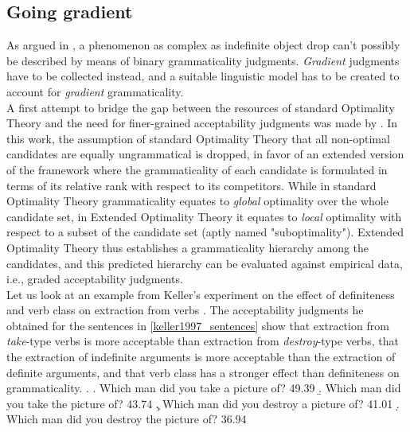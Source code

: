 \subsection{Going gradient}  %
As argued in , a phenomenon as complex as indefinite object drop can't possibly be described by means of binary grammaticality judgments. \textit{Gradient} judgments have to be collected instead, and a suitable linguistic model has to be created to account for \textit{gradient} grammaticality.\\
A first attempt to bridge the gap between the resources of standard Optimality Theory and the need for finer-grained acceptability judgments was made by \textcite{keller1997extraction}. In this work, the assumption of standard Optimality Theory that all non-optimal candidates are equally ungrammatical is dropped, in favor of an extended version of the framework where the grammaticality of each candidate is formulated in terms of its relative rank with respect to its competitors. While in standard Optimality Theory grammaticality equates to \textit{global} optimality over the whole candidate set, in Extended Optimality Theory it equates to \textit{local} optimality with respect to a subset of the candidate set (aptly named "suboptimality"). Extended Optimality Theory thus establishes a grammaticality hierarchy among the candidates, and this predicted hierarchy can be evaluated against empirical data, i.e., graded acceptability judgments.\\
Let us look at an example from Keller's experiment on the effect of definiteness and verb class on extraction from verbs \parencite[10-12]{keller1997extraction}. The acceptability judgments he obtained for the sentences in \ref{keller1997_sentences} show that extraction from \textit{take}-type verbs is more acceptable than extraction from \textit{destroy}-type verbs, that the extraction of indefinite arguments is more acceptable than the extraction of definite arguments, and that verb class has a stronger effect than definiteness on grammaticality.
\ex. \label{keller1997_sentences} \a. Which man did you take a picture of? \hfill 49.39
\b. Which man did you take the picture of? \hfill 43.74
\c. Which man did you destroy a picture of? \hfill 41.01
\d. Which man did you destroy the picture of? \hfill 36.94

